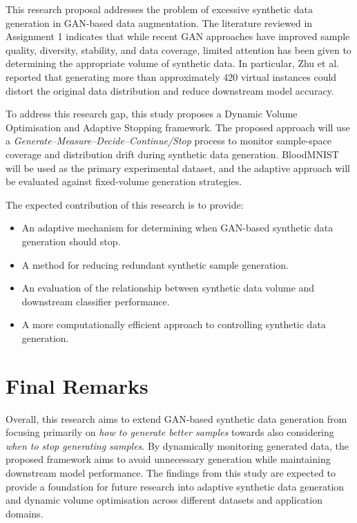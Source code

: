 \documentclass[12pt,a4paper]{report}
\begin{document}
\begin{justify}
This research proposal addresses the problem of excessive synthetic data generation in GAN-based data augmentation. The literature reviewed in Assignment 1 indicates that while recent GAN approaches have improved sample quality, diversity, stability, and data coverage, limited attention has been given to determining the appropriate volume of synthetic data. In particular, Zhu et al.~\parencite{zhu2025novel} reported that generating more than approximately 420 virtual instances could distort the original data distribution and reduce downstream model accuracy.

To address this research gap, this study proposes a Dynamic Volume Optimisation and Adaptive Stopping framework. The proposed approach will use a \textit{Generate--Measure--Decide--Continue/Stop} process to monitor sample-space coverage and distribution drift during synthetic data generation. BloodMNIST will be used as the primary experimental dataset, and the adaptive approach will be evaluated against fixed-volume generation strategies.

The expected contribution of this research is to provide:
\begin{itemize}
    \item An adaptive mechanism for determining when GAN-based synthetic data generation should stop.
    \item A method for reducing redundant synthetic sample generation.
    \item An evaluation of the relationship between synthetic data volume and downstream classifier performance.
    \item A more computationally efficient approach to controlling synthetic data generation.
\end{itemize}

\section{Final Remarks}

Overall, this research aims to extend GAN-based synthetic data generation from focusing primarily on \textit{how to generate better samples} towards also considering \textit{when to stop generating samples}. By dynamically monitoring generated data, the proposed framework aims to avoid unnecessary generation while maintaining downstream model performance. The findings from this study are expected to provide a foundation for future research into adaptive synthetic data generation and dynamic volume optimisation across different datasets and application domains.

\end{justify}

\newpage
{}
{}
\printbibliography[title={References}]
\end{document}
